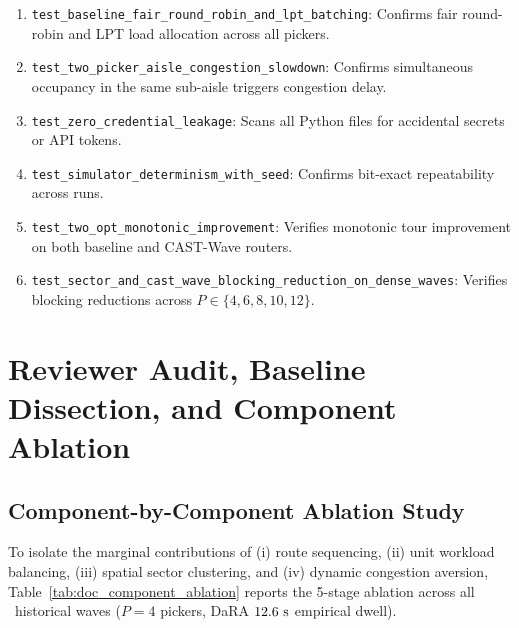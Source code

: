 \documentclass[11pt,a4paper]{article}
\begin{document}
\begin{enumerate}[leftmargin=*]
    \item \texttt{test\_baseline\_fair\_round\_robin\_and\_lpt\_batching}: Confirms fair round-robin and LPT load allocation across all pickers.
    \item \texttt{test\_two\_picker\_aisle\_congestion\_slowdown}: Confirms simultaneous occupancy in the same sub-aisle triggers congestion delay.
    \item \texttt{test\_zero\_credential\_leakage}: Scans all Python files for accidental secrets or API tokens.
    \item \texttt{test\_simulator\_determinism\_with\_seed}: Confirms bit-exact repeatability across runs.
    \item \texttt{test\_two\_opt\_monotonic\_improvement}: Verifies monotonic tour improvement on both baseline and CAST-Wave routers.
    \item \texttt{test\_sector\_and\_cast\_wave\_blocking\_reduction\_on\_dense\_waves}: Verifies blocking reductions across $P \in \{4, 6, 8, 10, 12\}$.
\end{enumerate}

\newpage
\section{Reviewer Audit, Baseline Dissection, and Component Ablation}

\subsection{Component-by-Component Ablation Study}
To isolate the marginal contributions of (i) route sequencing, (ii) unit workload balancing, (iii) spatial sector clustering, and (iv) dynamic congestion aversion, Table~\ref{tab:doc_component_ablation} reports the 5-stage ablation across all \BenchmarkWaves~historical waves ($P = 4$ pickers, DaRA $12.6\text{ s}$ empirical dwell).
\end{document}
